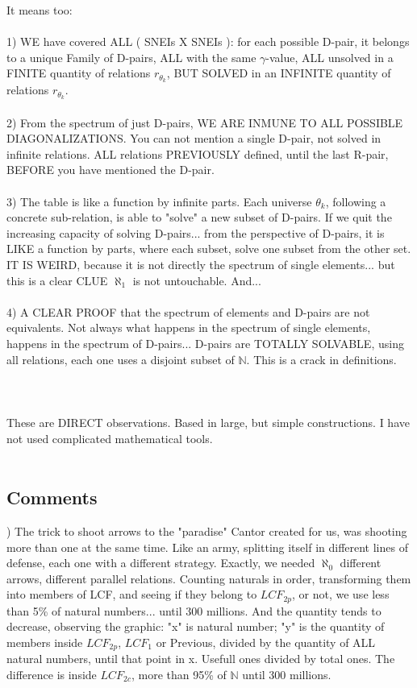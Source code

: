 	\noindent
	It means too:\\\\
	1) WE have covered ALL ( SNEIs X SNEIs ): for each possible D-pair, it belongs to a unique Family of D-pairs, ALL with the same $\gamma$-value, ALL unsolved in a FINITE quantity of relations $r_{\theta_{k}}$, BUT SOLVED in an INFINITE quantity of relations $r_{\theta_{k}}$.\\\\
	2) From the spectrum of just D-pairs, WE ARE INMUNE TO ALL POSSIBLE DIAGONALIZATIONS. You can not mention a single D-pair, not solved in infinite relations. ALL relations PREVIOUSLY defined, until the last R-pair, BEFORE you have mentioned the D-pair.\\\\
	3) The table is like a function by infinite parts. Each universe $\theta_{k}$, following a concrete sub-relation, is able to "solve" a new subset of D-pairs. If we quit the increasing capacity of solving D-pairs... from the perspective of D-pairs, it is LIKE a function by parts, where each subset, solve one subset from the other set. IT IS WEIRD, because it is not directly the spectrum of single elements... but this is a clear CLUE $\aleph_{1}$ is not untouchable. And...\\\\
	4) A CLEAR PROOF that the spectrum of elements and D-pairs are not equivalents. Not always what happens in the spectrum of single elements, happens in the spectrum of D-pairs... D-pairs are TOTALLY SOLVABLE, using all relations, each one uses a disjoint subset of $\mathbb{N}$. This is a crack in definitions.\\\\
	\\\\
	
	\noindent
	These are DIRECT observations. Based in large, but simple constructions. I have not used complicated mathematical tools.
	\\\\
	
	\subsection{Comments}
	
	) The trick to shoot arrows to the "paradise" Cantor created for us, was shooting more than one at the same time. Like an army, splitting itself in different lines of defense, each one with a different strategy. Exactly, we needed $\aleph_{0}$ different arrows, different parallel relations. Counting naturals in order, transforming them into members of LCF, and seeing if they belong to $LCF_{2p}$, or not, we use less than 5\% of natural numbers... until 300 millions. And the quantity tends to decrease, observing the graphic: "x" is natural number; "y" is the quantity of members inside $LCF_{2p}$, $LCF_{1}$ or Previous, divided by the quantity of ALL natural numbers, until that point in x. Usefull ones divided by total ones. The difference is inside $LCF_{2c}$, more than 95\% of $\mathbb{N}$ until 300 millions.
	\\\\
	
